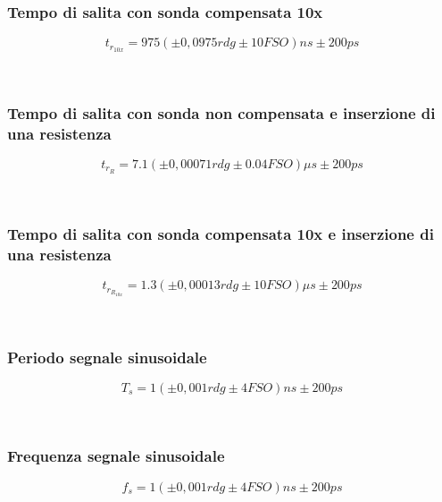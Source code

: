 \documentclass[a4paper]{article}
\begin{document}
\subsubsection{Tempo di salita con sonda compensata 10x}
\begin{Large}
	\begin{equation}
  		{t_{r_{10x}}}= 975(\pm 0,0975 rdg \pm10 FSO)ns \pm200ps %
	\end{equation}
\end{Large}\\
\subsubsection{Tempo di salita con sonda non compensata e inserzione di una resistenza}
\begin{Large}
	\begin{equation}
  		t_{r_R}= 7.1(\pm 0,00071 rdg \pm0.04 FSO)\mu s \pm200ps %
	\end{equation}
\end{Large}\\
\subsubsection{Tempo di salita con sonda compensata 10x e inserzione di una resistenza}
\begin{Large}
	\begin{equation}
  		{t_{r_{R_{10x}}}}= 1.3(\pm 0,00013 rdg \pm10 FSO)\mu s \pm200ps %
	\end{equation}
\end{Large}\\
\subsubsection{Periodo segnale sinusoidale}
\begin{Large}
	\begin{equation}
  		{T_s}= 1(\pm 0,001 rdg \pm4 FSO)ns \pm200ps
	\end{equation}
\end{Large}\\
\subsubsection{Frequenza segnale sinusoidale}
\begin{Large}
	\begin{equation}
  		{f_s}= 1(\pm 0,001 rdg \pm4 FSO)ns \pm200ps %
	\end{equation}
\end{Large}\\
\end{document}
